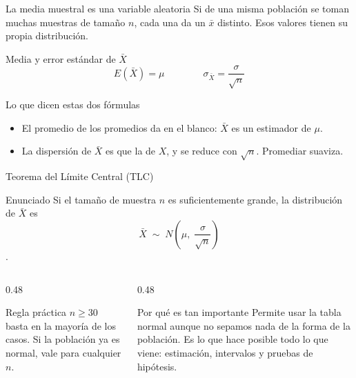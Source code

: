 \documentclass[aspectratio=169,10pt]{beamer}
\begin{document}
\begin{frame}{La media muestral es una variable aleatoria}
  Si de una misma población se toman muchas muestras de tamaño $n$, cada una da
  un $\bar{x}$ distinto. Esos valores tienen su propia distribución.

  \vspace{0.25cm}
  \begin{block}{Media y error estándar de $\bar{X}$}
    \[ E(\bar{X})=\mu \qquad\qquad
       \sigma_{\bar{X}}=\frac{\sigma}{\sqrt{n}} \]
  \end{block}

  \vspace{0.2cm}
  \begin{alertblock}{Lo que dicen estas dos fórmulas}
    \footnotesize
    \begin{itemize}
      \item El promedio de los promedios da en el blanco: $\bar{X}$ es un
            estimador  de $\mu$.
      \item La dispersión de $\bar{X}$ es  que la de $X$, y se
            reduce con $\sqrt{n}$. Promediar suaviza.
    \end{itemize}
  \end{alertblock}
\end{frame}

\begin{frame}{Teorema del Límite Central (TLC)}
  \begin{block}{Enunciado}
    \small
    Si el tamaño de muestra $n$ es suficientemente grande, la distribución de
    $\bar{X}$ es 
    \[ \bar{X}\;\sim\;N\!\left(\mu,\;\frac{\sigma}{\sqrt{n}}\right) \]
    .
  \end{block}

  \vspace{0.2cm}
  \begin{columns}[T,onlytextwidth]
    \begin{column}{0.48\textwidth}
      \begin{exampleblock}{Regla práctica}
        \footnotesize
        $n\ge 30$ basta en la mayoría de los casos. Si la población ya es
        normal, vale para cualquier $n$.
      \end{exampleblock}
    \end{column}
    \begin{column}{0.48\textwidth}
      \begin{alertblock}{Por qué es tan importante}
        \footnotesize
        Permite usar la tabla normal aunque no sepamos nada de la forma de la
        población. Es lo que hace posible todo lo que viene: estimación,
        intervalos y pruebas de hipótesis.
      \end{alertblock}
    \end{column}
  \end{columns}
\end{frame}
\end{document}
